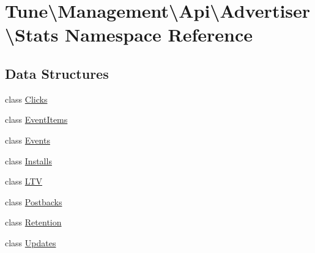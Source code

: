 \hypertarget{namespaceTune_1_1Management_1_1Api_1_1Advertiser_1_1Stats}{\section{Tune\textbackslash{}Management\textbackslash{}Api\textbackslash{}Advertiser\textbackslash{}Stats Namespace Reference}
\label{namespaceTune_1_1Management_1_1Api_1_1Advertiser_1_1Stats}
}
\subsection*{Data Structures}
\begin{DoxyCompactItemize}
\item 
class \hyperlink{classTune_1_1Management_1_1Api_1_1Advertiser_1_1Stats_1_1Clicks}{Clicks}
\item 
class \hyperlink{classTune_1_1Management_1_1Api_1_1Advertiser_1_1Stats_1_1EventItems}{Event\-Items}
\item 
class \hyperlink{classTune_1_1Management_1_1Api_1_1Advertiser_1_1Stats_1_1Events}{Events}
\item 
class \hyperlink{classTune_1_1Management_1_1Api_1_1Advertiser_1_1Stats_1_1Installs}{Installs}
\item 
class \hyperlink{classTune_1_1Management_1_1Api_1_1Advertiser_1_1Stats_1_1LTV}{L\-T\-V}
\item 
class \hyperlink{classTune_1_1Management_1_1Api_1_1Advertiser_1_1Stats_1_1Postbacks}{Postbacks}
\item 
class \hyperlink{classTune_1_1Management_1_1Api_1_1Advertiser_1_1Stats_1_1Retention}{Retention}
\item 
class \hyperlink{classTune_1_1Management_1_1Api_1_1Advertiser_1_1Stats_1_1Updates}{Updates}
\end{DoxyCompactItemize}
